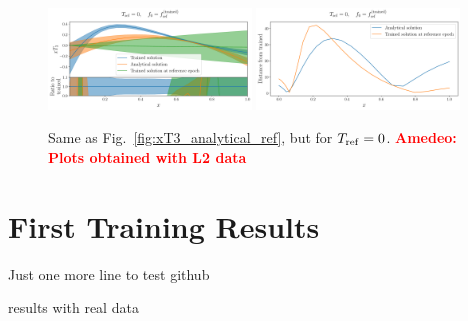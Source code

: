 \documentclass[11pt]{article}
\newcommand{\ac}[1]{\textcolor{red}{\textbf{Amedeo: #1}}}
\begin{document}
\begin{figure}[h]
  \centering
  \includegraphics[width=0.48\textwidth]{plots/pdf_plot_ref_0.pdf}
  \includegraphics[width=0.48\textwidth]{plots/distance_plot_ref_0.pdf}
  \caption{Same as Fig.~\ref{fig:xT3_analytical_ref}, but for $T_{\rm ref} = 0$.
  \ac{Plots obtained with L2 data}}
  \label{fig:xT3_analytical_ref_0}
\end{figure}


\newpage


\section{First Training Results}

Just one more line to test github

 results with real data



\end{document}
